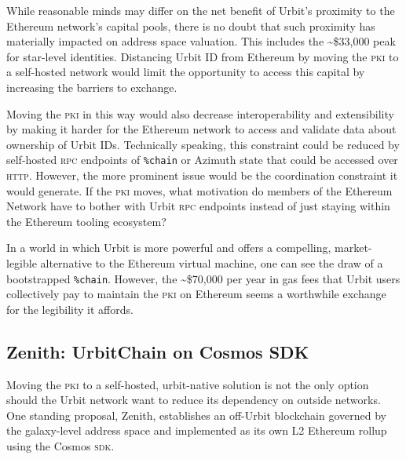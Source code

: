 \documentclass[twoside]{article}
\begin{document}
While reasonable minds may differ on the net benefit of Urbit's proximity to the Ethereum network's capital pools, there is no doubt that such proximity has materially impacted on address space valuation. This includes the \textasciitilde\$33,000 peak for star-level identities. Distancing Urbit ID from Ethereum by moving the \textsc{pki} to a self-hosted network would limit the opportunity to access this capital by increasing the barriers to exchange.

Moving the \textsc{pki} in this way would also decrease interoperability and extensibility by making it harder for the Ethereum network to access and validate data about ownership of Urbit IDs. Technically speaking, this constraint could be reduced by self-hosted \textsc{rpc} endpoints of \lstinline[style=inlinecode]{%chain} or Azimuth state that could be accessed over \textsc{http}. However, the more prominent issue would be the coordination constraint it would generate. If the \textsc{pki} moves, what motivation do members of the Ethereum Network have to bother with Urbit \textsc{rpc} endpoints instead of just staying within the Ethereum tooling ecosystem?

In a world in which Urbit is more powerful and offers a compelling, market-legible alternative to the Ethereum virtual machine, one can see the draw of a bootstrapped \lstinline[style=inlinecode]{%chain}. However, the \textasciitilde \$70,000 per year in gas fees that Urbit users collectively pay to maintain the \textsc{pki} on Ethereum seems a worthwhile exchange for the legibility it affords.

\subsection[Zenith:  UrbitChain on Cosmos \textsc{sdk}]{Zenith:  UrbitChain on Cosmos SDK}

Moving the \textsc{pki} to a self-hosted, urbit-native solution is not the only option should the Urbit network want to reduce its dependency on outside networks. One standing proposal, Zenith, establishes an off-Urbit blockchain governed by the galaxy-level address space and implemented as its own L2 Ethereum rollup using the Cosmos \textsc{sdk}.
\end{document}
